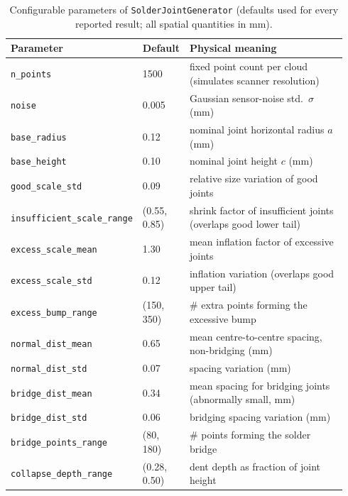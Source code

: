\documentclass[3p]{elsarticle}
\begin{document}
\begin{table}[htbp]
\centering
\caption{Configurable parameters of \texttt{SolderJointGenerator} (defaults used for every reported result; all spatial quantities in mm).}
\label{tab:params}
\renewcommand{\arraystretch}{1.12}
{\small
\begin{tabular}{@{}p{0.28\linewidth}p{0.11\linewidth}p{0.55\linewidth}@{}}
\toprule
\textbf{Parameter} & \textbf{Default} & \textbf{Physical meaning} \\
\midrule
\texttt{n\_points} & 1500 & fixed point count per cloud (simulates scanner resolution) \\
\texttt{noise} & 0.005 & Gaussian sensor-noise std.\ $\sigma$ (mm) \\
\texttt{base\_radius} & 0.12 & nominal joint horizontal radius $a$ (mm) \\
\texttt{base\_height} & 0.10 & nominal joint height $c$ (mm) \\
\texttt{good\_scale\_std} & 0.09 & relative size variation of good joints \\
\addlinespace
\texttt{insufficient\_scale\_range} & (0.55, 0.85) & shrink factor of insufficient joints (overlaps good lower tail) \\
\addlinespace
\texttt{excess\_scale\_mean} & 1.30 & mean inflation factor of excessive joints \\
\texttt{excess\_scale\_std} & 0.12 & inflation variation (overlaps good upper tail) \\
\texttt{excess\_bump\_range} & (150, 350) & \# extra points forming the excessive bump \\
\addlinespace
\texttt{normal\_dist\_mean} & 0.65 & mean centre-to-centre spacing, non-bridging (mm) \\
\texttt{normal\_dist\_std} & 0.07 & spacing variation (mm) \\
\texttt{bridge\_dist\_mean} & 0.34 & mean spacing for bridging joints (abnormally small, mm) \\
\texttt{bridge\_dist\_std} & 0.06 & bridging spacing variation (mm) \\
\texttt{bridge\_points\_range} & (80, 180) & \# points forming the solder bridge \\
\addlinespace
\texttt{collapse\_depth\_range} & (0.28, 0.50) & dent depth as fraction of joint height \\
\bottomrule
\end{tabular}}
\end{table}
\end{document}
